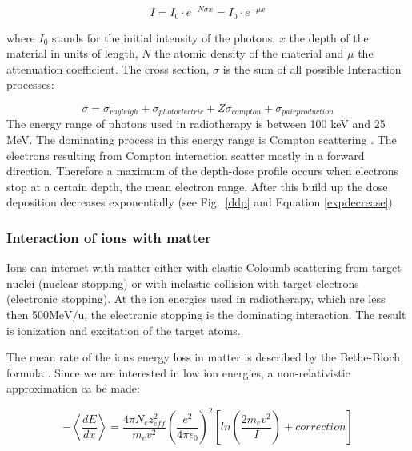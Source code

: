 \begin{equation}
 I = I_{0} \cdot e^{- N \sigma x} = I_{0} \cdot e^{-\mu x}
 \label{expdecrease}
\end{equation} 

where $I_{0}$ stands for the initial intensity of the photons, $x$ the depth of the material in units of length, $N$ the atomic density of the material and $\mu$ the attenuation coefficient. The cross section, $\sigma$ is the sum of all possible Interaction processes:

\begin{equation}
{\sigma} = \sigma_{rayleigh} + \sigma_{photoelectric} + Z\sigma_{compton} + \sigma_{pairproduction} 
\end{equation}
The energy range of photons used in radiotherapy is between 100 keV and 25 MeV. The dominating process in this energy range is Compton scattering \cite{Alpen1998}.
The electrons resulting from Compton interaction scatter mostly in a forward direction. Therefore a maximum of the depth-dose profile occurs when electrons stop at a certain depth, 
the mean electron range. After this build up the dose deposition decreases exponentially (see Fig.~\ref{ddp} and Equation \ref{expdecrease}).

\subsubsection{Interaction of ions with matter}
\label{iion}
Ions can interact with matter either with elastic Coloumb scattering from target nuclei (nuclear stopping) or with inelastic collision with target electrons (electronic stopping).
At the ion energies used in radiotherapy, which are less then 500$\mathrm{MeV}/\mathrm{u}$, the electronic stopping is the dominating interaction. The result is ionization and excitation of the target atoms.

The mean rate of the ions energy loss in matter is described by the Bethe-Bloch formula \cite{Bethe1930, Bloch1933}. Since we are interested in low ion energies, a non-relativistic approximation ca be made:

\begin{equation}
- \left \langle \frac{dE}{dx} \right \rangle = \frac{ 4 \pi N_{e} z_{eff}^{2} }{ m_{e} v^{2} } \left( \frac{e^{2}}{4\pi \epsilon_{0}} \right) ^{2} \left[ln \left( \frac{2m_{e}v^{2}}{I} \right)+correction \right]
 \label{bethe}
\end{equation}



